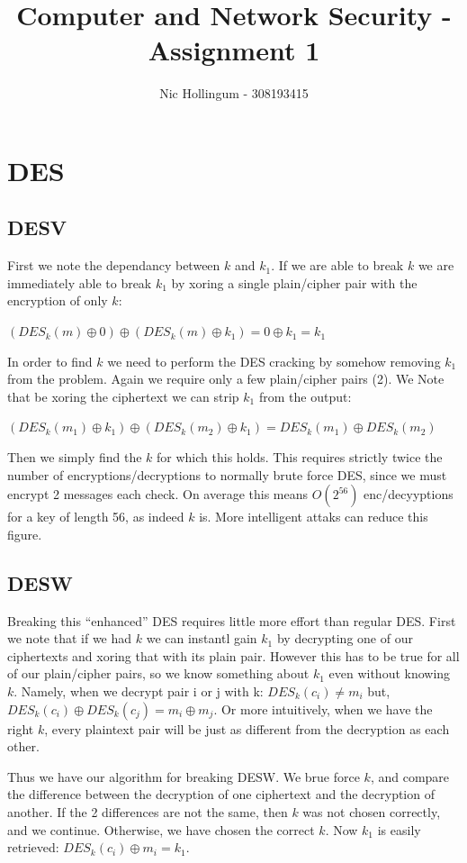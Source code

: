 \documentclass{article}
\author{Nic Hollingum - 308193415}
\title{Computer and Network Security - Assignment 1}
\begin{document}
\maketitle

\section{DES}
\subsection{DESV}
First we note the dependancy between $k$ and $k_1$.
If we are able to break $k$ we are immediately able to break $k_1$ by xoring a single plain/cipher pair with the encryption of only $k$:

$(DES_k (m) \oplus 0) \oplus (DES_k (m) \oplus k_1) = 0 \oplus k_1 = k_1$

In order to find $k$ we need to perform the DES cracking by somehow removing $k_1$ from the problem.
Again we require only a few plain/cipher pairs (2).
We Note that be xoring the ciphertext we can strip $k_1$ from the output:

$(DES_k (m_1) \oplus k_1) \oplus (DES_k (m_2) \oplus k_1) = DES_k (m_1) \oplus DES_k (m_2)$

Then we simply find the $k$ for which this holds.
This requires strictly twice the number of encryptions/decryptions to normally brute force DES, since we must encrypt 2 messages each check.
On average this means $O(2^{56})$ enc/decyyptions for a key of length 56, as indeed $k$ is.
More intelligent attaks can reduce this figure.

\subsection{DESW}
Breaking this ``enhanced'' DES requires little more effort than regular DES.
First we note that if we had $k$ we can instantl gain $k_1$ by decrypting one of our ciphertexts and xoring that with its plain pair.
However this has to be true for all of our plain/cipher pairs, so we know something about $k_1$ even without knowing $k$.
Namely, when we decrypt pair i or j with k: $DES_k (c_i) \ne m_i$ but, $DES_k (c_i) \oplus DES_k(c_j) = m_i \oplus m_j$.
Or more intuitively, when we have the right $k$, every plaintext pair will be just as different from the decryption as each other.

Thus we have our algorithm for breaking DESW.
We brue force $k$, and compare the difference between the decryption of one ciphertext and the decryption of another.
If the 2 differences are not the same, then $k$ was not chosen correctly, and we continue.
Otherwise, we have chosen the correct $k$.
Now $k_1$ is easily retrieved: $DES_k (c_i) \oplus m_i = k_1$.
\end{document}
